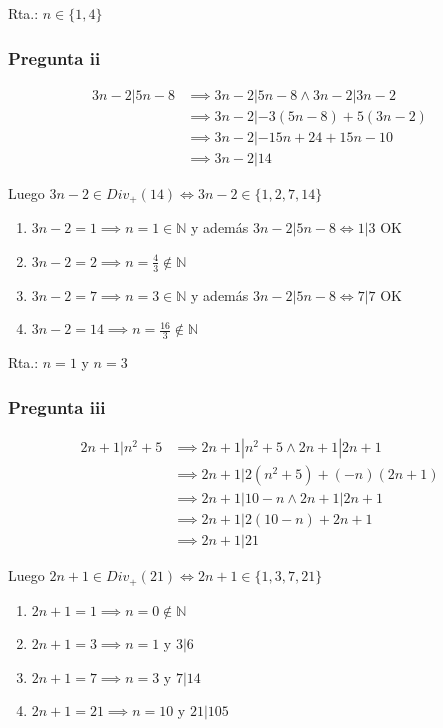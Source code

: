 Rta.: $ n \in \{ 1,4 \} $

\subsubsection{Pregunta ii}
\begin{align*}
    3n-2 | 5n-8 &\implies 3n-2 | 5n-8 \wedge 3n-2 | 3n-2 \\
    &\implies 3n-2 | -3(5n-8) + 5(3n-2) \\
    &\implies 3n-2 | -15n + 24 + 15n - 10 \\
    &\implies 3n-2 | 14
\end{align*}

Luego $ 3n-2 \in Div_+(14) \iff 3n-2 \in \{ 1,2,7,14 \} $

\begin{enumerate}[label=(\alph*)]
    \item $ 3n-2 = 1 \implies n = 1 \in \mathbb{N}$ y además $3n-2 | 5n-8 \iff 1|3$ OK
    \item $ 3n-2 = 2 \implies n = \frac{4}{3} \not \in \mathbb{N}$
    \item $ 3n-2 = 7 \implies n = 3 \in \mathbb{N}$ y además $3n-2 | 5n-8 \iff 7|7$ OK
    \item $ 3n-2 = 14 \implies n = \frac{16}{3} \not \in \mathbb{N}$
\end{enumerate}

Rta.: $n = 1$ y $n = 3$

\subsubsection{Pregunta iii}
\begin{align*}
    2n+1 | n^2+5 &\implies 2n+1 | n^2+5 \wedge 2n+1 | 2n+1 \\
    &\implies 2n+1 | 2(n^2+5) + (-n)(2n+1) \\
    &\implies 2n+1 | 10-n \wedge 2n+1 | 2n+1 \\
    &\implies 2n+1 | 2(10-n) + 2n+1 \\
    &\implies 2n+1 | 21
\end{align*}
  
Luego $ 2n+1 \in Div_+(21) \iff 2n+1 \in \{ 1,3,7,21 \}$

\begin{enumerate}[label=(\alph*)]
    \item $2n+1 = 1 \implies n = 0 \not \in \mathbb{N}$
    \item $2n+1 = 3 \implies n = 1 $ y $ 3|6 $
    \item $2n+1 = 7 \implies n = 3 $ y $ 7|14 $
    \item $2n+1 = 21 \implies n = 10 $ y $ 21|105 $
\end{enumerate}

